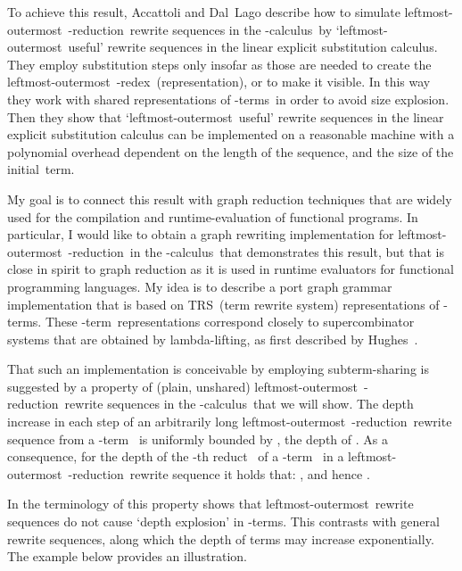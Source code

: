 \documentclass[
submission
]{dmtcs-episciences-tampered}
\newcommand{\nb}{\nobreakdash}
\newcommand{\TRS}{TRS}
\newcommand{\lambdacalculus}{\nb-cal\-cu\-lus}
\newcommand{\lambdaterm}{\nb-term}
\newcommand{\lambdaterms}{\lambdaterm{s}}
\newcommand{\lambdalifting}{lambda-lif\-ting}
\newcommand{\betareduction}{\nb-re\-duc\-tion}
\newcommand{\betaredex}{\nb-re\-dex}
\newcommand{\lo}{left\-most-outer\-most}
\theoremstyle{plain}
\theoremstyle{definition}
\begin{document}
To achieve this result, Accattoli and Dal~Lago describe how to simulate \lo\ \betareduction\ rewrite sequences in the \lambdacalculus\ by
`\lo\ useful' rewrite sequences in the linear explicit substitution calculus.
They employ substitution steps only insofar as those are needed to 
create the \lo\ \betaredex\ (representation), or to make it visible. 
In this way they work with shared representations of \lambdaterms\ in order to avoid size explosion. 
Then they show that `\lo\ useful' rewrite sequences in the linear explicit substitution calculus can be implemented on a reasonable machine
with a polynomial overhead dependent on the length of the sequence, and the size of the initial~term.\pagebreak[4]   

My goal is to connect this result with  graph reduction techniques that are widely used for the compilation and runtime-evaluation of functional programs.
In particular, I would like to obtain a graph rewriting implementation for \lo\ \betareduction\ in the \lambdacalculus\
that demonstrates this result, but that is close in spirit to graph reduction as it is used in runtime evaluators for functional programming languages.  
My idea is to describe a port graph grammar \cite{stew:2002} implementation that is based on 
\TRS\ (term rewrite system) representation{s} of \lambdaterm{s}.
These \lambdaterm\ representations correspond closely to supercombinator systems that are obtained by \lambdalifting, as first described by Hughes~\cite{hugh:1982:report}.

That such an implementation is conceivable by employing subterm-sharing 
is suggested by a property of (plain, unshared) \lo\ \betareduction\ rewrite sequences in the \lambdacalculus\
that we will show.
The depth increase in each step of an arbitrarily long \lo\ \betareduction\ rewrite sequence from a \lambdaterm~
is uniformly bounded by , the depth of .
As a consequence, for the depth of the \nb-th reduct~ of a \lambdaterm~ 
in a \lo\ \betareduction\ rewrite sequence  
it holds that: ,
and hence . 

In the terminology of \cite{acca:lago:2014:beta-reduction-invariant:LICS,acca:lago:2016}
this property shows that \lo\ rewrite sequences do not cause `depth explosion' in \lambdaterms. 
This contrasts with general  rewrite sequences,
along which the depth of terms may increase exponentially.
The example below provides an illustration. 
\end{document}
